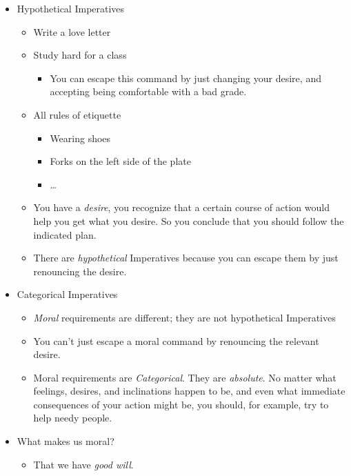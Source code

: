 \documentclass{article}
\begin{document}
\begin{spacing}{1.2}
    \newpage
    \begin{itemize}
        \item Hypothetical Imperatives
        \begin{itemize}
            \item Write a love letter
            \item Study hard for a class
            \begin{itemize}
                \item You can escape this command by just changing your desire, and accepting being comfortable with a bad grade.
            \end{itemize}
            \item All rules of etiquette
            \begin{itemize}
                \item Wearing shoes
                \item Forks on the left side of the plate
                \item \ldots
            \end{itemize}
            \item You have a \emph{desire}, you recognize that a certain course of action would help you get what you desire. So you conclude that you should follow the indicated plan.
            \item There are \emph{hypothetical} Imperatives because you can escape them by just renouncing the desire.
        \end{itemize}
        \item Categorical Imperatives
        \begin{itemize}
            \item \emph{Moral} requirements are different; they are not hypothetical Imperatives
            \item You can't just escape a moral command by renouncing the relevant desire.
            \item Moral requirements are \emph{Categorical}. They are \emph{absolute}. No matter what feelings, desires, and inclinations happen to be, and even what immediate consequences of your action might be, you should, for example, try to help needy people.
        \end{itemize}
        \item What makes us moral?
        \begin{itemize}
            \item That we have \emph{good will}.

\end{itemize}
\end{itemize}
\end{spacing}
\end{document}
